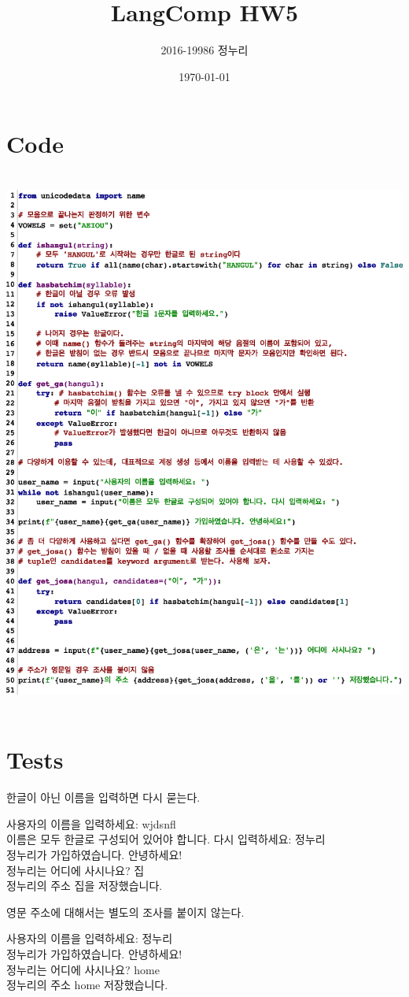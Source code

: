 \documentclass[a4paper,11pt]{scrartcl}
\title{\vspace{-0.5in}LangComp HW5}
\author{\vspace{-15pt}2016-19986 정누리}
\date{\vspace{-5pt}\today}
\begin{document}
\maketitle

\section*{Code}
\includegraphics[height=18cm]{hw05.eps}

\section*{Tests}
한글이 아닌 이름을 입력하면 다시 묻는다.
\par\bigskip
\begin{longfbox}[margin-left=1em]
  \ttfamily
  사용자의 이름을 입력하세요: wjdsnfl \\
  이름은 모두 한글로 구성되어 있어야 합니다. 다시 입력하세요: 정누리 \\
  정누리가 가입하였습니다. 안녕하세요! \\
  정누리는 어디에 사시나요? 집 \\
  정누리의 주소 집을 저장했습니다.
\end{longfbox}

\par\bigskip\noindent
영문 주소에 대해서는 별도의 조사를 붙이지 않는다.

\par\bigskip
\begin{longfbox}[margin-left=1em]
  \ttfamily
  사용자의 이름을 입력하세요: 정누리 \\
  정누리가 가입하였습니다. 안녕하세요! \\
  정누리는 어디에 사시나요? home \\
  정누리의 주소 home 저장했습니다.
\end{longfbox}
\end{document}
